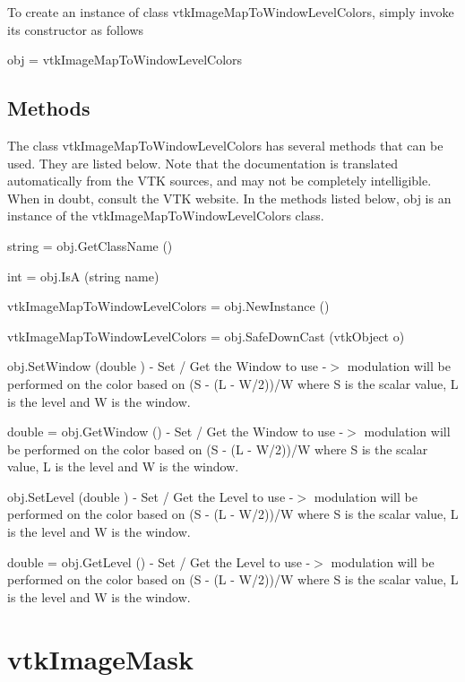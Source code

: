 To create an instance of class vtk\-Image\-Map\-To\-Window\-Level\-Colors, simply invoke its constructor as follows \begin{DoxyVerb}  obj = vtkImageMapToWindowLevelColors
\end{DoxyVerb}
 \hypertarget{vtkwidgets_vtkxyplotwidget_Methods}{}\subsection{Methods}\label{vtkwidgets_vtkxyplotwidget_Methods}
The class vtk\-Image\-Map\-To\-Window\-Level\-Colors has several methods that can be used. They are listed below. Note that the documentation is translated automatically from the V\-T\-K sources, and may not be completely intelligible. When in doubt, consult the V\-T\-K website. In the methods listed below, {\ttfamily obj} is an instance of the vtk\-Image\-Map\-To\-Window\-Level\-Colors class. 
\begin{DoxyItemize}
\item {\ttfamily string = obj.\-Get\-Class\-Name ()}  
\item {\ttfamily int = obj.\-Is\-A (string name)}  
\item {\ttfamily vtk\-Image\-Map\-To\-Window\-Level\-Colors = obj.\-New\-Instance ()}  
\item {\ttfamily vtk\-Image\-Map\-To\-Window\-Level\-Colors = obj.\-Safe\-Down\-Cast (vtk\-Object o)}  
\item {\ttfamily obj.\-Set\-Window (double )} -\/ Set / Get the Window to use -\/$>$ modulation will be performed on the color based on (S -\/ (L -\/ W/2))/\-W where S is the scalar value, L is the level and W is the window.  
\item {\ttfamily double = obj.\-Get\-Window ()} -\/ Set / Get the Window to use -\/$>$ modulation will be performed on the color based on (S -\/ (L -\/ W/2))/\-W where S is the scalar value, L is the level and W is the window.  
\item {\ttfamily obj.\-Set\-Level (double )} -\/ Set / Get the Level to use -\/$>$ modulation will be performed on the color based on (S -\/ (L -\/ W/2))/\-W where S is the scalar value, L is the level and W is the window.  
\item {\ttfamily double = obj.\-Get\-Level ()} -\/ Set / Get the Level to use -\/$>$ modulation will be performed on the color based on (S -\/ (L -\/ W/2))/\-W where S is the scalar value, L is the level and W is the window.  
\end{DoxyItemize}\hypertarget{vtkimaging_vtkimagemask}{}\section{vtk\-Image\-Mask}\label{vtkimaging_vtkimagemask}

